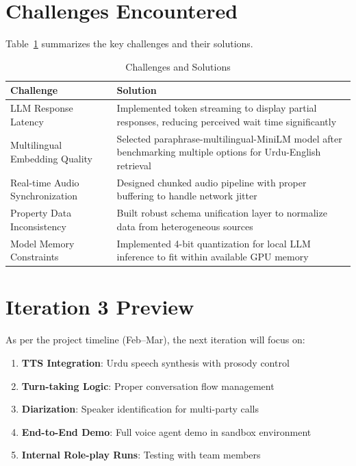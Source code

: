 \section{Challenges Encountered}

Table~\ref{tab:challenges} summarizes the key challenges and their solutions.

\begin{table}[!htbp]
\centering
\caption{Challenges and Solutions}
\label{tab:challenges}
\renewcommand{\arraystretch}{1.3}
\begin{tabular}{|p{5cm}|p{8cm}|} 
\hline
\textbf{Challenge} & \textbf{Solution} \\ \hline
LLM Response Latency & Implemented token streaming to display partial responses, reducing perceived wait time significantly \\ \hline
Multilingual Embedding Quality & Selected paraphrase-multilingual-MiniLM model after benchmarking multiple options for Urdu-English retrieval \\ \hline
Real-time Audio Synchronization & Designed chunked audio pipeline with proper buffering to handle network jitter \\ \hline
Property Data Inconsistency & Built robust schema unification layer to normalize data from heterogeneous sources \\ \hline
Model Memory Constraints & Implemented 4-bit quantization for local LLM inference to fit within available GPU memory \\ \hline
\end{tabular}
\end{table}

\section{Iteration 3 Preview}

As per the project timeline (Feb--Mar), the next iteration will focus on:

\begin{enumerate}
    \item \textbf{TTS Integration}: Urdu speech synthesis with prosody control
    \item \textbf{Turn-taking Logic}: Proper conversation flow management
    \item \textbf{Diarization}: Speaker identification for multi-party calls
    \item \textbf{End-to-End Demo}: Full voice agent demo in sandbox environment
    \item \textbf{Internal Role-play Runs}: Testing with team members
\end{enumerate}

